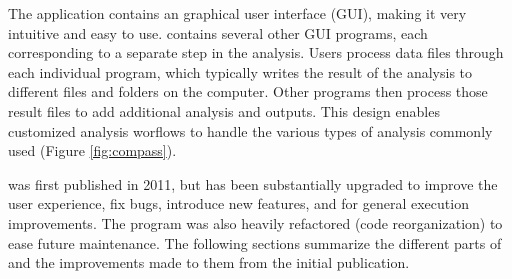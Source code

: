 The application contains an graphical user interface (GUI), making it very intuitive and easy to use. \compass{}  contains several other GUI programs, each corresponding to a separate step in the analysis. Users process data files through each individual program, which typically writes the result of the analysis to different files and folders on the computer. Other programs then process those result files to add additional analysis and outputs. This design enables customized analysis worflows to handle the various types of analysis commonly used (Figure \ref{fig:compass}). 



\compass{} was first published in 2011, but has been substantially upgraded to improve the user experience, fix bugs, introduce new features, and for general execution improvements. The program was also heavily refactored (code reorganization) to ease future maintenance. The following sections summarize the different parts of \compass{} and the improvements made to them from the initial publication.
 

